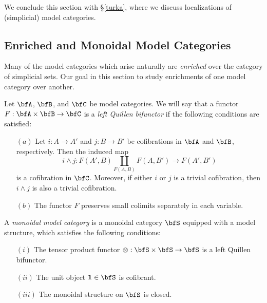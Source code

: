 \begin{Simplicial Categories}
We conclude this section with \S \ref{turka}, where we discuss localizations of (simplicial) model categories.


\subsection{Enriched and Monoidal Model Categories}\label{maymy}

Many of the model categories which arise naturally are {\em enriched} over the category
of simplicial sets. Our goal in this section to study enrichments of one model category over another.

\begin{definition}\label{biquill}
Let $\bfA$, $\bfB$, and $\bfC$ be model categories. We will say that a functor
$F: \bfA \times \bfB \rightarrow \bfC$ is a {\em left Quillen bifunctor} if the following conditions
are satisfied:
\begin{itemize}
\item[$(a)$] Let $i: A \rightarrow A'$ and $j: B \rightarrow B'$ be cofibrations in $\bfA$ and
$\bfB$, respectively. Then the induced map
$$i \wedge j: F(A',B) \coprod_{F(A,B)} F(A,B') \rightarrow F(A',B')$$
is a cofibration in $\bfC$. Moreover, if either $i$ or $j$ is a trivial cofibration, then
$i \wedge j$ is also a trivial cofibration.
\item[$(b)$] The functor $F$ preserves small colimits separately in each variable.
\end{itemize}
\end{definition}

\begin{definition}
A {\it monoidal model category} is a monoidal category $\bfS$ equipped with a model structure, which satisfies the following conditions:
\begin{itemize}
\item[$(i)$] The tensor product functor $\otimes: \bfS \times \bfS \rightarrow \bfS$ is a left
Quillen bifunctor.
\item[$(ii)$] The unit object ${\bf 1} \in \bfS$ is cofibrant.
\item[$(iii)$] The monoidal structure on $\bfS$ is closed.
\end{itemize}
\end{definition}


\end{Simplicial Categories}
